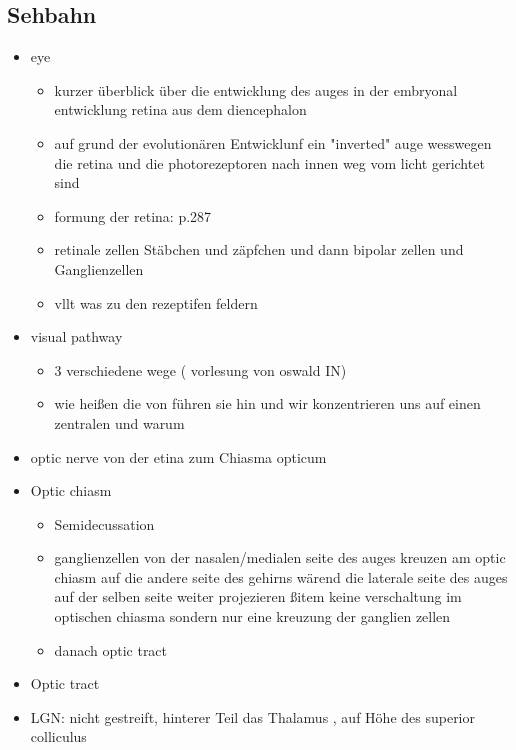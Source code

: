 \documentclass[12pt,a4paper,pdftex]{article}
\begin{document}
\subsection{Sehbahn}
\begin{itemize}
    \item eye
    \begin{itemize}
        \item kurzer überblick über die entwicklung des auges in der embryonal entwicklung retina aus dem diencephalon
        \item auf grund der evolutionären Entwicklunf ein "inverted" auge wesswegen die retina und die photorezeptoren nach innen weg vom licht gerichtet sind
        \item formung der retina: \cite{smith2008biology} p.287
        \item retinale zellen Stäbchen und zäpfchen und dann bipolar zellen und Ganglienzellen 
        \item vllt was zu den rezeptifen feldern
    \end{itemize}
    \item visual pathway
    \begin{itemize}
        \item 3 verschiedene wege ( vorlesung von oswald IN)
        \item wie heißen die von führen sie hin und wir konzentrieren uns auf einen zentralen und warum
    \end{itemize}
    \item optic nerve von der etina zum Chiasma opticum
    \item Optic chiasm    
    \begin{itemize}
        \item Semidecussation  
        \item ganglienzellen von der nasalen/medialen seite des auges kreuzen am optic chiasm auf die andere seite des gehirns wärend die laterale seite des auges auf der selben seite weiter projezieren
        ßitem keine verschaltung im optischen chiasma sondern nur eine kreuzung der ganglien zellen
        \item danach optic tract
    \end{itemize}
    \item Optic tract 
    \item LGN: nicht gestreift, hinterer Teil das Thalamus , auf Höhe des superior colliculus 

\end{itemize}
\end{document}
